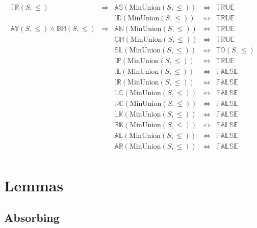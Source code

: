 \documentclass[10pt]{article}
\newcommand{\propname}[1]{{\mathbb{#1}}}
\begin{document}
\[
\begin{array}{lcrcl} 
\propname{TR}(S, \leq)
  & \Rightarrow
  & \propname{AS}(\mathrm{MinUnion}(S, \leq)) 
  & \Leftrightarrow 
  & \propname{TRUE}
  \\ 
& & \propname{ID}(\mathrm{MinUnion}(S, \leq)) 
  & \Leftrightarrow 
  & \propname{TRUE}
  \\ 
\propname{AY}(S, \leq) \wedge \propname{BM}(S, \leq)
  & \Rightarrow
  & \propname{AN}(\mathrm{MinUnion}(S, \leq)) 
  & \Leftrightarrow 
  & \propname{TRUE}
  \\
& & \propname{CM}(\mathrm{MinUnion}(S, \leq)) 
  & \Leftrightarrow 
  & \propname{TRUE}
  \\ 
& & \propname{SL}(\mathrm{MinUnion}(S, \leq)) 
  & \Leftrightarrow 
  & \propname{TO}(S, \leq)  
  \\ 
& & \propname{IP}(\mathrm{MinUnion}(S, \leq)) 
  & \Leftrightarrow 
  & \propname{TRUE}
  \\ 
& & \propname{IL}(\mathrm{MinUnion}(S, \leq)) 
  & \Leftrightarrow 
  & \propname{FALSE}
  \\ 
& & \propname{IR}(\mathrm{MinUnion}(S, \leq)) 
  & \Leftrightarrow 
  & \propname{FALSE}
  \\ 
& & \propname{LC}(\mathrm{MinUnion}(S, \leq)) 
  & \Leftrightarrow 
  & \propname{FALSE}
  \\ 
& & \propname{RC}(\mathrm{MinUnion}(S, \leq)) 
  & \Leftrightarrow 
  & \propname{FALSE} 
  \\ 
& & \propname{LK}(\mathrm{MinUnion}(S, \leq)) 
  & \Leftrightarrow 
  & \propname{FALSE} 
  \\ 
& & \propname{RK}(\mathrm{MinUnion}(S, \leq)) 
  & \Leftrightarrow 
  & \propname{FALSE}
  \\ 
& & \propname{AL}(\mathrm{MinUnion}(S, \leq))  
  & \Leftrightarrow 
  & \propname{FALSE} 
  \\ 
& & \propname{AR}(\mathrm{MinUnion}(S, \leq))  
  & \Leftrightarrow 
  & \propname{FALSE} 
  \\ 
\end{array} 
\] 

\section{Lemmas}

\subsection{Absorbing}
\end{document}
